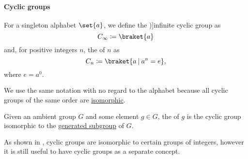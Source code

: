 \paragraph{Cyclic groups}

\begin{definition}\label{def:cyclic_group}
  For a singleton alphabet \( \set{ a } \), we define the \term[ru=(бесконечная) циклическая группа (\cite[sec. 2.11]{Тыртышников2007ЛинАлгебра})]{infinite cyclic group} as
  \begin{equation}\label{def:cyclic_group/infinite}
    C_\infty \coloneqq \braket{ a }
  \end{equation}
  and, for positive integers \( n \), the  of  \( n \) as
  \begin{equation}\label{def:cyclic_group/finite}
    C_n \coloneqq \braket{ a \given a^n = e },
  \end{equation}
  where \( e = a^0 \).

  We use the same notation with no regard to the alphabet because all cyclic groups of the same order are \hyperref[def:group/homomorphism]{isomorphic}.
\end{definition}
\begin{comments}
  \item Given an ambient group \( G \) and some element \( g \in G \), the  of \( g \) is the cyclic group isomorphic to the \hyperref[def:group/submodel]{generated subgroup} of \( G \).

  \item As shown in , cyclic groups are isomorphic to certain groups of integers, however it is still useful to have cyclic groups as a separate concept.
\end{comments}

